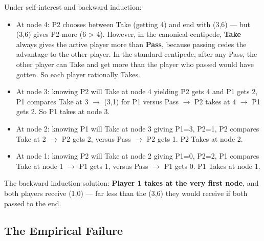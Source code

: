 \documentclass[12pt, letterpaper]{article}
\begin{document}
Under self-interest and backward induction:
\begin{itemize}
\item At node 4: P2 chooses between Take (getting 4) and end with (3,6) --- but (3,6) gives P2 more (6 > 4). However, in the canonical centipede, \textbf{Take} always gives the active player more than \textbf{Pass}, because passing cedes the advantage to the other player. In the standard centipede, after any Pass, the other player can Take and get more than the player who passed would have gotten. So each player rationally Takes.
\item At node 3: knowing P2 will Take at node 4 yielding P2 gets 4 and P1 gets 2, P1 compares Take at 3 $\rightarrow$ (3,1) for P1 versus Pass $\rightarrow$ P2 takes at 4 $\rightarrow$ P1 gets 2. So P1 takes at node 3.
\item At node 2: knowing P1 will Take at node 3 giving P1=3, P2=1, P2 compares Take at 2 $\rightarrow$ P2 gets 2, versus Pass $\rightarrow$ P2 gets 1. P2 Takes at node 2.
\item At node 1: knowing P2 will Take at node 2 giving P1=0, P2=2, P1 compares Take at node 1 $\rightarrow$ P1 gets 1, versus Pass $\rightarrow$ P1 gets 0. P1 Takes at node 1.
\end{itemize}

The backward induction solution: \textbf{Player 1 takes at the very first node}, and both players receive (1,0) --- far less than the (3,6) they would receive if both passed to the end.


\subsection{The Empirical Failure}
\end{document}
